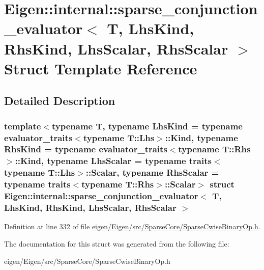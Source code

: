 \hypertarget{struct_eigen_1_1internal_1_1sparse__conjunction__evaluator}{}\section{Eigen\+:\+:internal\+:\+:sparse\+\_\+conjunction\+\_\+evaluator$<$ T, Lhs\+Kind, Rhs\+Kind, Lhs\+Scalar, Rhs\+Scalar $>$ Struct Template Reference}
\label{struct_eigen_1_1internal_1_1sparse__conjunction__evaluator}


\subsection{Detailed Description}
\subsubsection*{template$<$typename T, typename Lhs\+Kind = typename evaluator\+\_\+traits$<$typename T\+::\+Lhs$>$\+::\+Kind, typename Rhs\+Kind = typename evaluator\+\_\+traits$<$typename T\+::\+Rhs$>$\+::\+Kind, typename Lhs\+Scalar = typename traits$<$typename T\+::\+Lhs$>$\+::\+Scalar, typename Rhs\+Scalar = typename traits$<$typename T\+::\+Rhs$>$\+::\+Scalar$>$\newline
struct Eigen\+::internal\+::sparse\+\_\+conjunction\+\_\+evaluator$<$ T, Lhs\+Kind, Rhs\+Kind, Lhs\+Scalar, Rhs\+Scalar $>$}



Definition at line \hyperlink{eigen_2_eigen_2src_2_sparse_core_2_sparse_cwise_binary_op_8h_source_l00332}{332} of file \hyperlink{eigen_2_eigen_2src_2_sparse_core_2_sparse_cwise_binary_op_8h_source}{eigen/\+Eigen/src/\+Sparse\+Core/\+Sparse\+Cwise\+Binary\+Op.\+h}.



The documentation for this struct was generated from the following file\+:\begin{DoxyCompactItemize}
\item 
eigen/\+Eigen/src/\+Sparse\+Core/\+Sparse\+Cwise\+Binary\+Op.\+h\end{DoxyCompactItemize}
